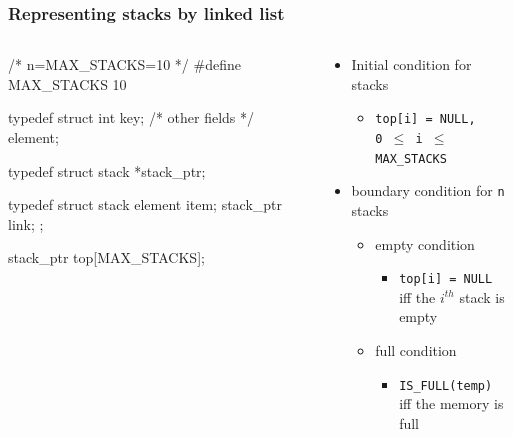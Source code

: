 \documentclass[newPxFont,sthlmFooter,nooffset]{beamer}
\begin{document}
\begin{frame}[t, fragile]
  \frametitle{Representing stacks by linked list}
  \begin{columns}
    \begin{column}{0.5\textwidth}
  \begin{ncodedef}
/* n=MAX_STACKS=10 */ 
#define MAX_STACKS 10

typedef struct {
    int key; 
    /* other fields */ 
} element;

typedef struct stack *stack_ptr; 

typedef struct stack {
    element item;
    stack_ptr link; 
};

stack_ptr top[MAX_STACKS];    
  \end{ncodedef}      
    \end{column}
    \begin{column}{0.5\textwidth}
      \begin{itemize}
      \item Initial condition for stacks
        \begin{itemize}
        \item \texttt{top[i] = NULL, \\0 $\leq$ i $\leq$ MAX\_STACKS}
        \end{itemize}
      \item boundary condition for \texttt{n} stacks
        \begin{itemize}
        \item empty condition
          \begin{itemize}
          \item \texttt{top[i] = NULL} \\iff the $i^{th}$ stack is empty
          \end{itemize}

        \item full condition
          \begin{itemize}
          \item \texttt{IS\_FULL(temp)} \\iff the memory is full
          \end{itemize}

        \end{itemize}

      \end{itemize}
    \end{column}
  \end{columns}

\end{frame}
\end{document}

